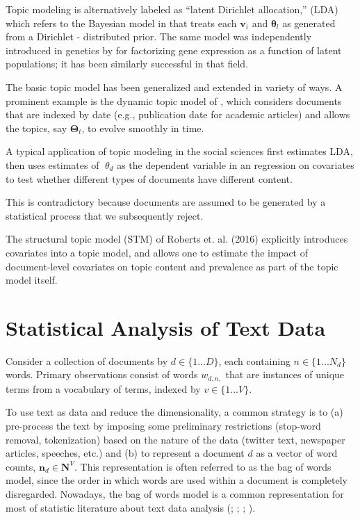 \documentclass[12pt,a4paper,notitlepage]{article}
\begin{document}
Topic modeling is alternatively labeled as “latent Dirichlet allocation,” (LDA) which refers to the Bayesian model in \citet{blei_latent_2003} that treats each $\boldsymbol{v}_i$ and $\boldsymbol{\theta}_l$ as generated from a Dirichlet - distributed prior.
The same model was independently introduced in genetics by \citet{pritchard_inference_2000} for factorizing gene expression as a function of latent populations; it has been similarly successful in that field. 

The basic topic model has been generalized and extended in variety of ways. A prominent example is the dynamic topic model of \citet{blei_dynamic_2006}, which considers documents that are indexed by date (e.g., publication date for academic articles) and allows the topics, say $\boldsymbol{\Theta}_t$, to evolve smoothly in time. 

A typical application of topic modeling in the social sciences first estimates LDA, then uses estimates of $\theta_d$ as the dependent variable in an regression on covariates to test whether different types of documents have different content. 

This is contradictory because documents are assumed to be generated by a statistical process that we subsequently reject.

The structural topic model (STM) of Roberts et. al. (2016) explicitly introduces covariates into a topic model, and allows one to estimate the impact of document-level covariates on topic content and prevalence as part of the topic model itself.

\section{Statistical Analysis of Text Data}

Consider a collection of documents by $d \in \lbrace 1 ... D \rbrace$, each containing $n \in \lbrace 1 ... N_d \rbrace$ words. Primary observations consist of words $w_{d,n,}$ that are instances of unique terms from a vocabulary of terms, indexed by $v \in \lbrace 1 ... V \rbrace$. 

To use text as data and reduce the dimensionality, a common strategy is to (a) pre-process the text by imposing some preliminary restrictions (stop-word removal, tokenization) based on the nature of the data (twitter text, newspaper articles, speeches, etc.) and (b) to represent a document $d$ as a vector of word counts, $\boldsymbol{n}_d \in \boldsymbol{N}^V$. This representation is often referred to as the bag of words model, since the order in which words are used within a document is completely disregarded. Nowadays, the bag of words model is a common representation for most of statistic literature about text data analysis (\citet{blei_latent_2003}; \citet{erosheva_mixed-membership_2004}; \citet{griffiths_finding_2004}; \citet{genkin_large-scale_2007}).
\end{document}
